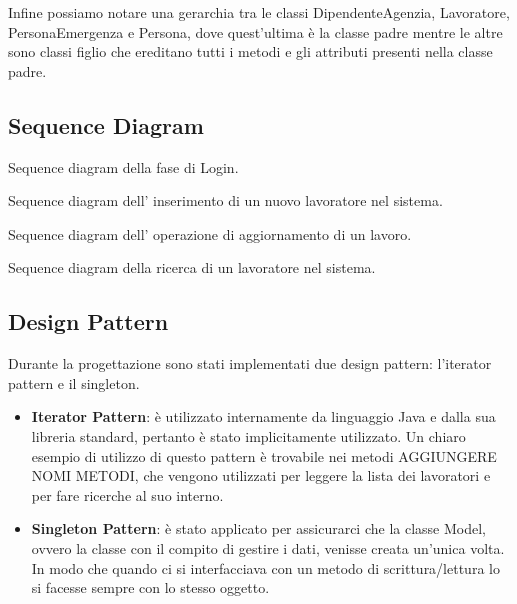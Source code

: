 \documentclass{article}
\begin{document}
Infine possiamo notare una gerarchia tra le classi DipendenteAgenzia, Lavoratore, PersonaEmergenza e Persona, dove quest'ultima è la classe padre mentre le altre sono classi figlio che ereditano tutti i metodi e gli attributi presenti nella classe padre.



    \subsection{Sequence Diagram}
    
    
    
    Sequence diagram della fase di Login.
    
    
    
    Sequence diagram dell' inserimento di un nuovo lavoratore nel sistema.
    
    
    
    Sequence diagram dell' operazione di aggiornamento di un lavoro.
    
    
    
    Sequence diagram della ricerca di un lavoratore nel sistema.
    

    \subsection{Design Pattern}

    Durante la progettazione sono stati implementati due design pattern: l'iterator pattern e il singleton.

    \begin{itemize}
        \item[] \textbf{Iterator Pattern}: è utilizzato internamente da linguaggio Java e dalla sua
libreria standard, pertanto è stato implicitamente utilizzato. Un chiaro esempio di utilizzo di
questo pattern è trovabile nei metodi AGGIUNGERE NOMI METODI, che vengono utilizzati per leggere la lista dei lavoratori e per fare ricerche al suo interno.
        \item[] \textbf{Singleton Pattern}: è stato applicato per assicurarci che la classe Model, ovvero la classe con il compito di gestire i dati, venisse creata un'unica volta. In modo che quando ci si interfacciava con un metodo di scrittura/lettura lo si facesse sempre con lo stesso oggetto.
    \end{itemize}
\end{document}
